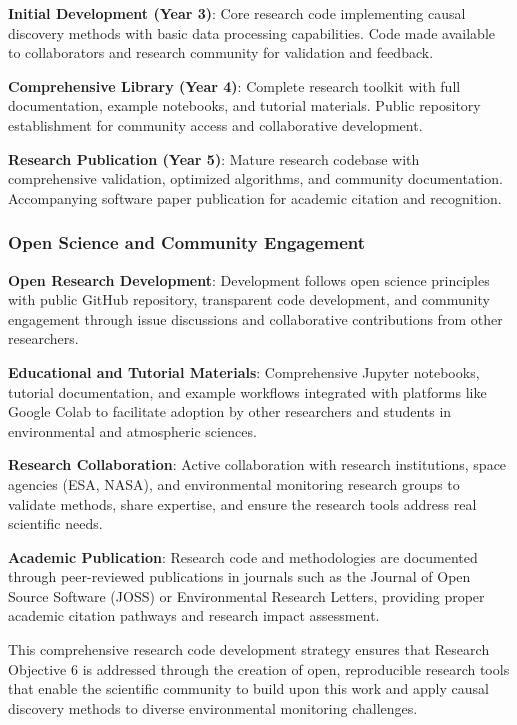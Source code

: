 \textbf{Initial Development (Year 3)}: Core research code implementing causal discovery methods with basic data processing capabilities. Code made available to collaborators and research community for validation and feedback.

\textbf{Comprehensive Library (Year 4)}: Complete research toolkit with full documentation, example notebooks, and tutorial materials. Public repository establishment for community access and collaborative development.

\textbf{Research Publication (Year 5)}: Mature research codebase with comprehensive validation, optimized algorithms, and community documentation. Accompanying software paper publication for academic citation and recognition.

\subsubsection{Open Science and Community Engagement}

\textbf{Open Research Development}: Development follows open science principles with public GitHub repository, transparent code development, and community engagement through issue discussions and collaborative contributions from other researchers.

\textbf{Educational and Tutorial Materials}: Comprehensive Jupyter notebooks, tutorial documentation, and example workflows integrated with platforms like Google Colab to facilitate adoption by other researchers and students in environmental and atmospheric sciences.

\textbf{Research Collaboration}: Active collaboration with research institutions, space agencies (ESA, NASA), and environmental monitoring research groups to validate methods, share expertise, and ensure the research tools address real scientific needs.

\textbf{Academic Publication}: Research code and methodologies are documented through peer-reviewed publications in journals such as the Journal of Open Source Software (JOSS) or Environmental Research Letters, providing proper academic citation pathways and research impact assessment.

This comprehensive research code development strategy ensures that Research Objective 6 is addressed through the creation of open, reproducible research tools that enable the scientific community to build upon this work and apply causal discovery methods to diverse environmental monitoring challenges.

